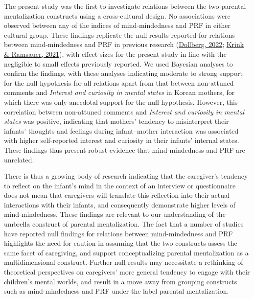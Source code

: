 \documentclass[
]{article}
\begin{document}
The present study was the first to investigate relations between the two parental mentalization constructs using a cross-cultural design. No associations were observed between any of the indices of mind-mindedness and PRF in either cultural group. These findings replicate the null results reported for relations between mind-mindedness and PRF in previous research (\protect\hyperlink{ref-Dollberg2022}{Dollberg, 2022}; \protect\hyperlink{ref-Krink2021}{Krink \& Ramsauer, 2021}), with effect sizes for the present study in line with the negligible to small effects previously reported. We used Bayesian analyses to confirm the findings, with these analyses indicating moderate to strong support for the null hypothesis for all relations apart from that between non-attuned comments and \emph{Interest and curiosity in mental states} in Korean mothers, for which there was only anecdotal support for the null hypothesis. However, this correlation between non-attuned comments and \emph{Interest and curiosity in mental states} was positive, indicating that mothers' tendency to misinterpret their infants' thoughts and feelings during infant--mother interaction was associated with higher self-reported interest and curiosity in their infants' internal states. These findings thus present robust evidence that mind-mindedness and PRF are unrelated.

There is thus a growing body of research indicating that the caregiver's tendency to reflect on the infant's mind in the context of an interview or questionnaire does not mean that caregivers will translate this reflection into their actual interactions with their infants, and consequently demonstrate higher levels of mind-mindedness. These findings are relevant to our understanding of the umbrella construct of parental mentalization. The fact that a number of studies have reported null findings for relations between mind-mindedness and PRF highlights the need for caution in assuming that the two constructs assess the same facet of caregiving, and support conceptualizing parental mentalization as a multidimensional construct. Further null results may necessitate a rethinking of theoretical perspectives on caregivers' more general tendency to engage with their children's mental worlds, and result in a move away from grouping constructs such as mind-mindedness and PRF under the label parental mentalization.
\end{document}

